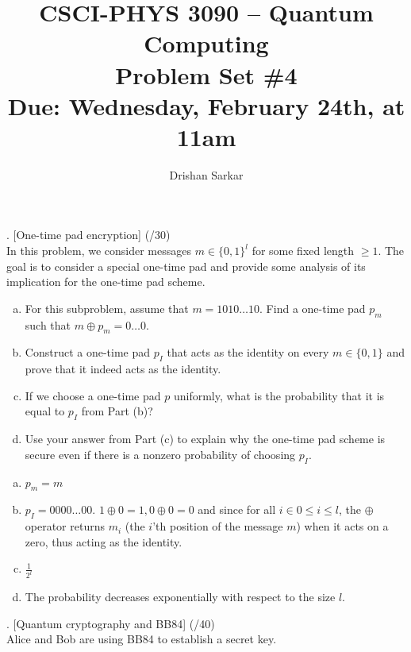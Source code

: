 \documentclass[11pt]{article}
\newenvironment{solution}{\begin{mdframed}[skipabove=\baselineskip,innertopmargin=\baselineskip,innerbottommargin=\baselineskip]
  }{\end{mdframed}}
\begin{document}
\author{Drishan Sarkar}
 
\title{CSCI-PHYS 3090 -- Quantum Computing\\ Problem Set \#4 \\  Due: Wednesday, February 24th, at 11am}
\maketitle

 
. [One-time pad encryption] (/30)
\vspace{1em} \\
In this problem, we consider messages $m\in\{0,1\}^l$ for some fixed length $\geq 1$. The goal is to consider a special one-time pad and provide some analysis of its implication for the one-time pad scheme.

\begin{enumerate}[(a)]
    \item For this subproblem, assume that $m = 1010\dots10$. Find a one-time pad $p_m$ such that $m\oplus p_m = 0\dots0$.
    \item Construct a one-time pad $p_I$ that acts as the identity on every $m \in \{0,1\}$ and prove that it indeed acts as the identity.
    \item If we choose a one-time pad $p$ uniformly, what is the probability that it is equal to $p_I$ from Part (b)?
    \item Use your answer from Part (c) to explain why the one-time pad scheme is secure even if there is a nonzero probability of choosing $p_I$.
\end{enumerate}

\begin{solution}
\begin{enumerate}[(a)]
    \item $p_m = m$
    \item $p_I = 0000\dots00$. $1\oplus0=1,0\oplus0=0$ and since for all $i \in 0 \leq i \leq l$, the $\oplus$ operator returns $m_i$ (the $i$'th position of the message $m$) when it acts on a zero, thus acting as the identity.
    \item $\frac{1}{2^l}$
    \item The probability decreases exponentially with respect to the size $l$.  
\end{enumerate}
\end{solution}

\newpage

. [Quantum cryptography and BB84] (/40)
\vspace{1em} \\
Alice and Bob are using BB84 to establish a secret key.
\end{document}

